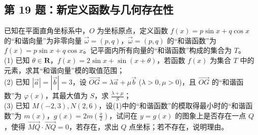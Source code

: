 \documentclass[11pt,a4paper]{ctexart}
\begin{document}
\subsection*{第 19 题：新定义函数与几何存在性}
已知在平面直角坐标系中，\(O\) 为坐标原点，定义函数 \(f(x)=p\sin x+q\cos x\) 的“和谐向量”为非零向量 \(\vec{\omega}=(p,q)\)，\(\vec{\omega}=(p,q)\) 的“和谐函数”为 \(f(x)=p\sin x+q\cos x\)。记平面内所有向量的“和谐函数”构成的集合为 \(T\)。\\
(1) 已知 \(\theta \in \mathbf{R}\)，\(f(x)=2\sin x+\sin(x+\theta)\)，若函数 \(f(x)\) 为集合 \(T\) 中的元素，求其“和谐向量”模的取值范围；\\
(2) 已知 \(|\vec{a}|=|\vec{b}|=3\)，设 \(\overrightarrow{OG}=\lambda\vec{a}+\mu\vec{b}\) (\(\lambda>0, \mu>0\))，且 \(\overrightarrow{OG}\) 的“和谐函数”为 \(\varphi(x)\)，其最大值为 \(S\)，求 \(\frac{\lambda+\mu}{S}\)；\\
(3) 已知 \(M(-2,3), N(2,6)\)，设(1)中的“和谐函数”的模取得最小时的“和谐函数”为 \(m(x)\)，\(g(x)=2m(\frac{x}{2})\)，试问在 \(y=g(x)\) 的图象上是否存在一点 \(Q\)，使得 \(\overrightarrow{MQ} \cdot \overrightarrow{NQ}=0\)，若存在，求出 \(Q\) 点坐标；若不存在，说明理由。


\end{document}
